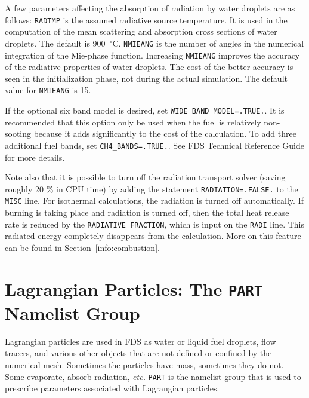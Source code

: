 \documentclass[11pt]{book}
\newcommand{\ct}{\tt\small}
\begin{document}
A few parameters affecting the absorption of radiation by water
droplets are as follows: {\ct RADTMP} is the assumed radiative source temperature.
It is used in the computation of the mean scattering
and absorption cross sections of water droplets. The default is 900~$^\circ$C.
{\ct NMIEANG} is the number of angles in the numerical integration of the Mie-phase function.
Increasing {\ct NMIEANG} improves the accuracy
of the radiative properties of water droplets. The cost
of the better accuracy is seen in the initialization phase,
not during the actual simulation. The default value for {\ct NMIEANG}
is 15.

If the optional six band model is desired,
set {\ct WIDE\_BAND\_MODEL=.TRUE.}. It is recommended that this option
only be used when the fuel is relatively non-sooting because it
adds significantly to the cost of the calculation. To add three
additional fuel bands, set {\ct CH4\_BANDS=.TRUE.}. See FDS Technical
Reference Guide for more details.

Note also that it is possible to turn off the radiation transport
solver (saving roughly 20 \% in CPU time) by adding the statement
{\ct RADIATION=.FALSE.} to the {\ct MISC} line. For isothermal
calculations, the radiation is turned off automatically. If burning
is taking place and radiation is turned off, then the total heat
release rate is reduced by the {\ct RADIATIVE\_FRACTION}, which is
input on the {\ct RADI} line. This radiated energy completely
disappears from the calculation. More on this feature can be found in
Section~\ref{info:combustion}.





\clearpage

\chapter{Lagrangian Particles: The \texorpdfstring{{\tt PART}}{PART} Namelist Group}
\label{info:PART}

Lagrangian particles are used in FDS as water or liquid fuel
droplets, flow tracers, and various other objects that are not defined or confined by the numerical mesh. Sometimes the
particles have mass, sometimes they do not. Some evaporate,
absorb radiation, {\em etc.}
{\ct PART} is the namelist group that is used to prescribe
parameters associated with Lagrangian particles.
\end{document}
